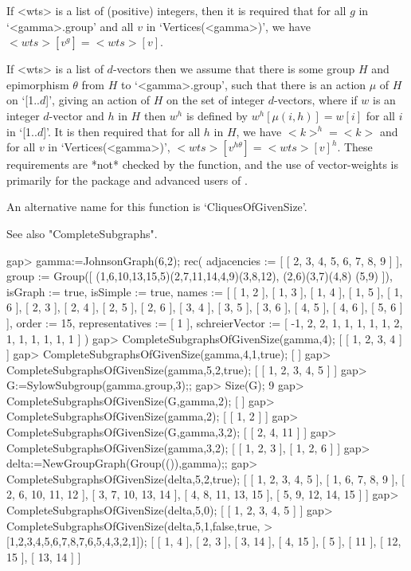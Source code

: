 If <wts> is a list of (positive) integers, then it is required that
for all $g$ in `<gamma>.group' and all $v$ in `Vertices(<gamma>)',
we have $<wts>[v^g]=<wts>[v]$.

If <wts> is a list of $d$-vectors then we assume that there is some group
$H$ and epimorphism $\theta$ from $H$ to `<gamma>.group', such that there
is an action $\mu$ of $H$ on `[1..$d$]', giving an action of $H$ on the
set of integer $d$-vectors, where if $w$ is an integer $d$-vector and
$h$ in $H$ then $w^h$ is defined by $w^h[\mu(i,h)]=w[i]$ for all $i$
in `[1..$d$]'. It is then required that for all $h$ in $H$, we have
$<k>^h=<k>$ and for all $v$ in `Vertices(<gamma>)', $<wts>[v^{h\theta}]
= <wts>[v]^h$.  These requirements are *not* checked by the function,
and the use of vector-weights is primarily for the {\DESIGN} package
and advanced users of {\GRAPE}.

An alternative name for this function is 
`CliquesOfGivenSize'.

See also "CompleteSubgraphs".

\beginexample
gap> gamma:=JohnsonGraph(6,2);                       
rec( adjacencies := [ [ 2, 3, 4, 5, 6, 7, 8, 9 ] ], 
  group := Group([ (1,6,10,13,15,5)(2,7,11,14,4,9)(3,8,12), (2,6)(3,7)(4,8)
      (5,9) ]), isGraph := true, isSimple := true, 
  names := [ [ 1, 2 ], [ 1, 3 ], [ 1, 4 ], [ 1, 5 ], [ 1, 6 ], [ 2, 3 ], 
      [ 2, 4 ], [ 2, 5 ], [ 2, 6 ], [ 3, 4 ], [ 3, 5 ], [ 3, 6 ], [ 4, 5 ], 
      [ 4, 6 ], [ 5, 6 ] ], order := 15, representatives := [ 1 ], 
  schreierVector := [ -1, 2, 2, 1, 1, 1, 1, 1, 2, 1, 1, 1, 1, 1, 1 ] )
gap> CompleteSubgraphsOfGivenSize(gamma,4);
[ [ 1, 2, 3, 4 ] ]
gap> CompleteSubgraphsOfGivenSize(gamma,4,1,true);
[  ]
gap> CompleteSubgraphsOfGivenSize(gamma,5,2,true);
[ [ 1, 2, 3, 4, 5 ] ]
gap> G:=SylowSubgroup(gamma.group,3);;
gap> Size(G);
9
gap> CompleteSubgraphsOfGivenSize(G,gamma,2);
[  ]
gap> CompleteSubgraphsOfGivenSize(gamma,2);
[ [ 1, 2 ] ]
gap> CompleteSubgraphsOfGivenSize(G,gamma,3,2);
[ [ 2, 4, 11 ] ]
gap> CompleteSubgraphsOfGivenSize(gamma,3,2);
[ [ 1, 2, 3 ], [ 1, 2, 6 ] ]
gap> delta:=NewGroupGraph(Group(()),gamma);;
gap> CompleteSubgraphsOfGivenSize(delta,5,2,true);
[ [ 1, 2, 3, 4, 5 ], [ 1, 6, 7, 8, 9 ], [ 2, 6, 10, 11, 12 ], 
  [ 3, 7, 10, 13, 14 ], [ 4, 8, 11, 13, 15 ], [ 5, 9, 12, 14, 15 ] ]
gap> CompleteSubgraphsOfGivenSize(delta,5,0);
[ [ 1, 2, 3, 4, 5 ] ]
gap> CompleteSubgraphsOfGivenSize(delta,5,1,false,true,
>    [1,2,3,4,5,6,7,8,7,6,5,4,3,2,1]);
[ [ 1, 4 ], [ 2, 3 ], [ 3, 14 ], [ 4, 15 ], [ 5 ], [ 11 ], [ 12, 15 ], 
  [ 13, 14 ] ]
\endexample

